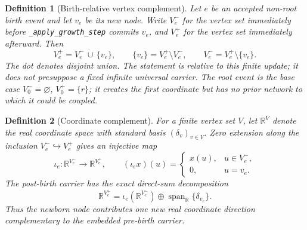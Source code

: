 \documentclass[11pt]{article}
\newtheorem{definition}{Definition}[section]
\theoremstyle{remark}
\newcommand{\code}[1]{\texttt{#1}}
\newcommand{\R}{\mathbb{R}}
\numberwithin{equation}{section}
\begin{document}
\begin{definition}[Birth-relative vertex complement]
Let $e$ be an accepted non-root birth event and let $v_e$ be its new node. Write $V_e^-$ for the vertex set immediately before \code{\_apply\_growth\_step} commits $v_e$, and $V_e^+$ for the vertex set immediately afterward. Then
\begin{equation}
  V_e^+=V_e^-\,\dot\cup\,\{v_e\},
  \qquad
  \{v_e\}=V_e^+\setminus V_e^-,
  \qquad
  V_e^-=V_e^+\setminus\{v_e\}.
  \label{eq:birth-relative-set-complement}
\end{equation}
The dot denotes disjoint union. The statement is relative to this finite update; it does not presuppose a fixed infinite universal carrier. The root event is the base case $V_0^-=\varnothing$, $V_0^+=\{r\}$; it creates the first coordinate but has no prior network to which it could be coupled.
\end{definition}

\begin{definition}[Coordinate complement]
For a finite vertex set $V$, let $\R^V$ denote the real coordinate space with standard basis $(\delta_v)_{v\in V}$. Zero extension along the inclusion $V_e^-\hookrightarrow V_e^+$ gives an injective map
\begin{equation}
  \iota_e:\R^{V_e^-}\longrightarrow\R^{V_e^+},
  \qquad
  (\iota_e x)(u)=
  \begin{cases}
    x(u), & u\in V_e^-,\\
    0, & u=v_e.
  \end{cases}
  \label{eq:birth-zero-extension}
\end{equation}
The post-birth carrier has the exact direct-sum decomposition
\begin{equation}
  \R^{V_e^+}
  =\iota_e(\R^{V_e^-})\oplus\operatorname{span}_{\R}\{\delta_{v_e}\}.
  \label{eq:birth-relative-coordinate-complement}
\end{equation}
Thus the newborn node contributes one new real coordinate direction complementary to the embedded pre-birth carrier.
\end{definition}
\end{document}
